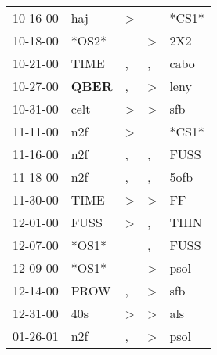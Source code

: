 \begin{supertabular}{p{0.07\textwidth}p{0.06\textwidth}p{0.02\textwidth}p{0.02\textwidth}p{0.06\textwidth}}
          10-16-00\textsuperscript{} &            haj\textsuperscript{} &     \textgreater &               &                            *CS1* \\
          10-18-00\textsuperscript{} &                            *OS2* &                  &  \textgreater &            2X2\textsuperscript{} \\
          10-21-00\textsuperscript{} &           TIME\textsuperscript{} &                , &             , &           cabo\textsuperscript{} \\
          10-27-00\textsuperscript{} &  \textbf{QBER\textsuperscript{}} &                , &  \textgreater &           leny\textsuperscript{} \\
          10-31-00\textsuperscript{} &           celt\textsuperscript{} &     \textgreater &  \textgreater &            sfb\textsuperscript{} \\
          11-11-00\textsuperscript{} &            n2f\textsuperscript{} &     \textgreater &               &                            *CS1* \\
          11-16-00\textsuperscript{} &            n2f\textsuperscript{} &                , &             , &           FUSS\textsuperscript{} \\
          11-18-00\textsuperscript{} &            n2f\textsuperscript{} &                , &             , &           5ofb\textsuperscript{} \\
          11-30-00\textsuperscript{} &           TIME\textsuperscript{} &     \textgreater &  \textgreater &             FF\textsuperscript{} \\
          12-01-00\textsuperscript{} &           FUSS\textsuperscript{} &     \textgreater &             , &           THIN\textsuperscript{} \\
          12-07-00\textsuperscript{} &                            *OS1* &                  &             , &           FUSS\textsuperscript{} \\
          12-09-00\textsuperscript{} &                            *OS1* &                  &  \textgreater &           psol\textsuperscript{} \\
          12-14-00\textsuperscript{} &           PROW\textsuperscript{} &                , &  \textgreater &            sfb\textsuperscript{} \\
          12-31-00\textsuperscript{} &            40s\textsuperscript{} &     \textgreater &  \textgreater &            als\textsuperscript{} \\
          01-26-01\textsuperscript{} &            n2f\textsuperscript{} &                , &  \textgreater &           psol\textsuperscript{} \\

\end{supertabular}
